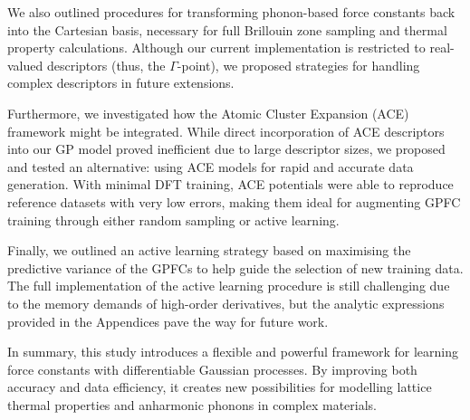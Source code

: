 We also outlined procedures for transforming phonon-based force constants back into the Cartesian basis, necessary for full Brillouin zone sampling and thermal property calculations. Although our current implementation is restricted to real-valued descriptors (thus, the $\Gamma$-point), we proposed strategies for handling complex descriptors in future extensions.

Furthermore, we investigated how the Atomic Cluster Expansion (ACE) framework might be integrated. While direct incorporation of ACE descriptors into our GP model proved inefficient due to large descriptor sizes, we proposed and tested an alternative: using ACE models for rapid and accurate data generation. With minimal DFT training, ACE potentials were able to reproduce reference datasets with very low errors, making them ideal for augmenting GPFC training through either random sampling or active learning.

Finally, we outlined an active learning strategy based on maximising the predictive variance of the GPFCs to help guide the selection of new training data. The full implementation of the active learning procedure is still challenging due to the memory demands of high-order derivatives, but the analytic expressions provided in the Appendices pave the way for future work.

In summary, this study introduces a flexible and powerful framework for learning force constants with differentiable Gaussian processes. 
By improving both accuracy and data efficiency, it creates new possibilities for modelling lattice thermal properties and anharmonic phonons in complex materials.
